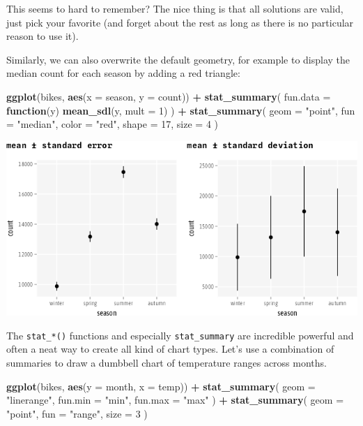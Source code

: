 \documentclass[
]{krantz}
\makeatletter
\newenvironment{Shaded}{\begin{snugshade}}{\end{snugshade}}
\newcommand{\AttributeTok}[1]{\textcolor[rgb]{0.27,0.27,0.27}{#1}}
\newcommand{\ControlFlowTok}[1]{\textcolor[rgb]{0.27,0.27,0.27}{\textbf{#1}}}
\newcommand{\DecValTok}[1]{\textcolor[rgb]{0.06,0.06,0.06}{#1}}
\newcommand{\FunctionTok}[1]{\textcolor[rgb]{0.27,0.27,0.27}{\textbf{#1}}}
\newcommand{\NormalTok}[1]{#1}
\newcommand{\SpecialCharTok}[1]{\textcolor[rgb]{0.43,0.43,0.43}{\textbf{#1}}}
\newcommand{\StringTok}[1]{\textcolor[rgb]{0.5,0.5,0.5}{#1}}
\newenvironment{kframe}{%
\medskip{}
\setlength{\fboxsep}{.8em}
 \def\at@end@of@kframe{}%
 \ifinner\ifhmode%
  \def\at@end@of@kframe{\end{minipage}}%
  \begin{minipage}{\columnwidth}%
 \fi\fi%
 \def\FrameCommand##1{\hskip\@totalleftmargin \hskip-\fboxsep
 \colorbox{shadecolor}{##1}\hskip-\fboxsep
     \hskip-\linewidth \hskip-\@totalleftmargin \hskip\columnwidth}%
 \MakeFramed {\advance\hsize-\width
   \@totalleftmargin\z@ \linewidth\hsize
   \@setminipage}}%
 {\par\unskip\endMakeFramed%
 \at@end@of@kframe}
\renewenvironment{Shaded}{\begin{kframe}}{\end{kframe}}
\makeatother
\begin{document}
This seems to hard to remember? The nice thing is that all solutions are valid, just pick your favorite (and forget about the rest as long as there is no particular reason to use it).

Similarly, we can also overwrite the default geometry, for example to display the median count for each season by adding a red triangle:

\begin{Shaded}
\begin{Highlighting}[]
\FunctionTok{ggplot}\NormalTok{(bikes, }\FunctionTok{aes}\NormalTok{(}\AttributeTok{x =}\NormalTok{ season, }\AttributeTok{y =}\NormalTok{ count)) }\SpecialCharTok{+}
  \FunctionTok{stat\_summary}\NormalTok{(}
    \AttributeTok{fun.data =} \ControlFlowTok{function}\NormalTok{(y) }\FunctionTok{mean\_sdl}\NormalTok{(y, }\AttributeTok{mult =} \DecValTok{1}\NormalTok{)}
\NormalTok{  ) }\SpecialCharTok{+}
  \FunctionTok{stat\_summary}\NormalTok{(}
    \AttributeTok{geom =} \StringTok{"point"}\NormalTok{,}
    \AttributeTok{fun =} \StringTok{"median"}\NormalTok{,}
    \AttributeTok{color =} \StringTok{"red"}\NormalTok{,}
    \AttributeTok{shape =} \DecValTok{17}\NormalTok{,}
    \AttributeTok{size =} \DecValTok{4}
\NormalTok{  )}
\end{Highlighting}
\end{Shaded}

\includegraphics{bookdown_files/figure-latex/unnamed-chunk-28-1.png}

The \texttt{stat\_*()} functions and especially \texttt{stat\_summary} are incredible powerful and often a neat way to create all kind of chart types. Let's use a combination of summaries to draw a dumbbell chart of temperature ranges across months.

\begin{Shaded}
\begin{Highlighting}[]
\FunctionTok{ggplot}\NormalTok{(bikes, }\FunctionTok{aes}\NormalTok{(}\AttributeTok{y =}\NormalTok{ month, }\AttributeTok{x =}\NormalTok{ temp)) }\SpecialCharTok{+} 
  \FunctionTok{stat\_summary}\NormalTok{(}
    \AttributeTok{geom =} \StringTok{"linerange"}\NormalTok{,}
    \AttributeTok{fun.min =} \StringTok{"min"}\NormalTok{,}
    \AttributeTok{fun.max =} \StringTok{"max"}
\NormalTok{  ) }\SpecialCharTok{+}
  \FunctionTok{stat\_summary}\NormalTok{(}
    \AttributeTok{geom =} \StringTok{"point"}\NormalTok{,}
    \AttributeTok{fun =} \StringTok{"range"}\NormalTok{,}
    \AttributeTok{size =} \DecValTok{3}
\NormalTok{  )}
\end{Highlighting}
\end{Shaded}
\end{document}
